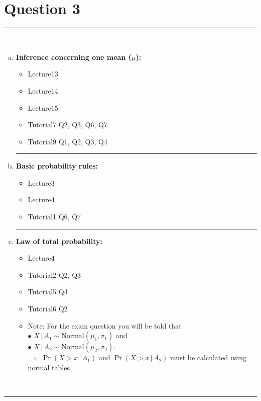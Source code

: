 \documentclass[12pt]{article}
\begin{document}
\section*{Question 3 }
\noindent\rule{\linewidth}{1pt}
\quad\\[-0.5cm]
\begin{enumerate}[a)]
\item {\bf Inference concerning one mean ($\mu$):}
\begin{itemize}
\item Lecture13
\item Lecture14 %
\item Lecture15 %
\item Tutorial7 Q2, Q3, Q6, Q7
\item Tutorial9 Q1, Q2, Q3, Q4
\end{itemize}
\begin{center}\noindent\rule{0.4\linewidth}{0.5pt}\end{center}
\item {\bf Basic probability rules:}
\begin{itemize}
\item Lecture3 %
\item Lecture4 %
\item Tutorial1 Q6, Q7
\end{itemize}
    \begin{center}\noindent\rule{0.4\linewidth}{0.5pt}\end{center}
\item {\bf Law of total probability:}
\begin{itemize}
\item Lecture4 %
\item Tutorial2 Q2, Q3
\item Tutorial5 Q4
\item Tutorial6 Q2
\item Note: For the exam question you will be told that\\
\quad$\bullet\,\, X\,|\,A_1 \sim \text{Normal}(\mu_1,\sigma_1)$ and\\
\quad$\bullet\,\, X\,|\,A_2 \sim \text{Normal}(\mu_2,\sigma_2)$.\\
 $\Rightarrow$ $\Pr(X>x\,|\,A_1)$ and $\Pr(X>x\,|\,A_2)$ must be calculated using normal tables.
\end{itemize}
\end{enumerate}
\quad\\[-0.3cm]
\noindent\rule{\linewidth}{1pt}
\end{document}

